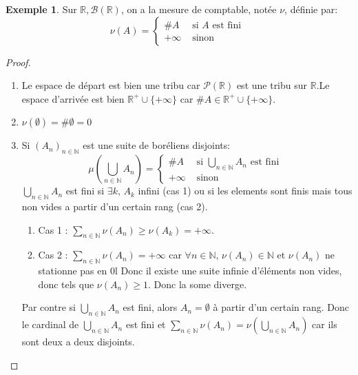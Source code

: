 \documentclass{article}
\theoremstyle{definition}
\theoremstyle{definition}
\theoremstyle{definition}
\theoremstyle{definition}
\newtheorem{example}{Exemple}
\theoremstyle{plain}
\theoremstyle{definition}
\begin{document}
\begin{example}
	Sur $\mathbb{R}, \mathscr{B}(\mathbb{R})$, on a la mesure de comptable, notée $\nu$, définie par:
	\begin{equation*}
		\nu(A) = \left\{
		\begin{array}{ll}
			\#A     & \text{ si } A \text{ est fini } \\
			+\infty & \text{ sinon }
		\end{array}
		\right.
	\end{equation*}
\end{example}

\begin{proof}
	\begin{enumerate}
		\item Le espace de départ est bien une tribu car $\mathscr{P}(\mathbb{R})$ est une tribu sur $\mathbb{R}$.Le
		      espace d'arrivée est bien $\mathbb{R}^+ \cup \{+\infty\}$ car $\#A \in \mathbb{R}^+ \cup \{+\infty\}$.
		\item $\nu(\emptyset) = \#\emptyset = 0$
		\item Si $(A_n)_{n \in \mathbb{N}}$ est une suite de boréliens disjoints:
		      \begin{equation*}
			      \mu(\bigcup\limits_{n \in \mathbb{N}} A_n) = \left\{\begin{array}{ll}
				      \#A     & \text{ si } \bigcup\limits_{n \in \mathbb{N}} A_n \text{ est fini } \\
				      +\infty & \text{ sinon }
			      \end{array}
			      \right.
		      \end{equation*}
		      $\bigcup\limits_{n \in \mathbb{N}} A_n$ est fini si $\exists k ,\, A_k$ infini (cas 1) ou si les elements sont
		      finis mais tous non vides a partir d'un certain rang (cas 2).
		      \begin{enumerate}
			      \item Cas 1 : $\sum\limits_{n \in \mathbb{N}} \nu(A_n) \geq \nu(A_k) = +\infty$.
			      \item Cas 2 : $\sum\limits_{n \in \mathbb{N}} \nu(A_n) = +\infty$ car
			            $\forall n \in \mathbb{N}, \, \nu(A_n) \in \mathbb{N}$ et $\nu(A_n)$ ne stationne pas en 0l Donc il existe une suite
			            infinie d'éléments non vides, donc tels que $\nu(A_n) \geq 1$. Donc la some diverge.
		      \end{enumerate}
		      Par contre si $\bigcup\limits_{n \in \mathbb{N}} A_n$ est fini, alors $A_n = \emptyset$ à partir d'un certain rang.
		      Donc le cardinal de $\bigcup\limits_{n \in \mathbb{N}} A_n$ est fini et $\sum\limits_{n \in \mathbb{N}} \nu(A_n) = \nu(\bigcup\limits_{n \in \mathbb{N}} A_n)$ car ils
		      sont deux a deux disjoints.
	\end{enumerate}
\end{proof}
\end{document}
